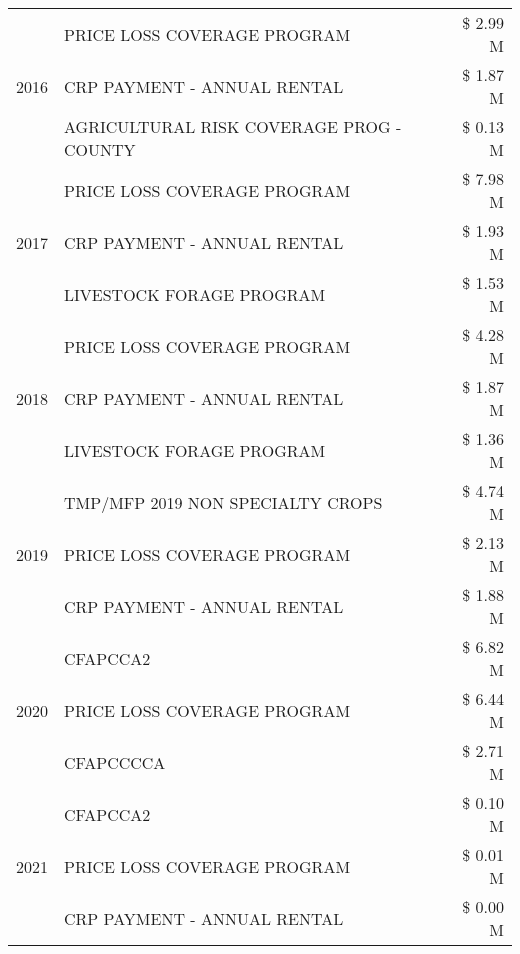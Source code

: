 \begin{tabular}{llr}
\cline{1-3}
\multirow[t]{3}{*}{2016} & PRICE LOSS COVERAGE PROGRAM & \$ 2.99 M \\
 & CRP PAYMENT - ANNUAL RENTAL & \$ 1.87 M \\
 & AGRICULTURAL RISK COVERAGE PROG - COUNTY & \$ 0.13 M \\
\cline{1-3}
\multirow[t]{3}{*}{2017} & PRICE LOSS COVERAGE PROGRAM & \$ 7.98 M \\
 & CRP PAYMENT - ANNUAL RENTAL & \$ 1.93 M \\
 & LIVESTOCK FORAGE PROGRAM & \$ 1.53 M \\
\cline{1-3}
\multirow[t]{3}{*}{2018} & PRICE LOSS COVERAGE PROGRAM & \$ 4.28 M \\
 & CRP PAYMENT - ANNUAL RENTAL & \$ 1.87 M \\
 & LIVESTOCK FORAGE PROGRAM & \$ 1.36 M \\
\cline{1-3}
\multirow[t]{3}{*}{2019} & TMP/MFP 2019 NON SPECIALTY CROPS & \$ 4.74 M \\
 & PRICE LOSS COVERAGE PROGRAM & \$ 2.13 M \\
 & CRP PAYMENT - ANNUAL RENTAL & \$ 1.88 M \\
\cline{1-3}
\multirow[t]{3}{*}{2020} & CFAPCCA2 & \$ 6.82 M \\
 & PRICE LOSS COVERAGE PROGRAM & \$ 6.44 M \\
 & CFAPCCCCA & \$ 2.71 M \\
\cline{1-3}
\multirow[t]{3}{*}{2021} & CFAPCCA2 & \$ 0.10 M \\
 & PRICE LOSS COVERAGE PROGRAM & \$ 0.01 M \\
 & CRP PAYMENT - ANNUAL RENTAL & \$ 0.00 M \\
\cline{1-3}
\bottomrule
\end{tabular}
